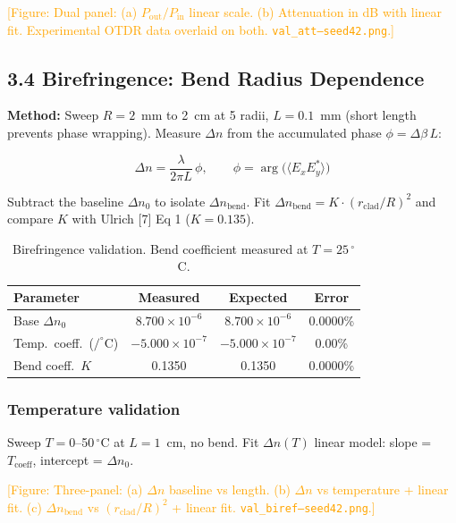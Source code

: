 \documentclass[11pt,a4paper]{article}
\newcommand{\figref}[1]{\textcolor{orange}{[Figure: #1]}}
\begin{document}
\figref{Dual panel: (a) $P_{\text{out}}/P_{\text{in}}$ linear scale.
  (b) Attenuation in dB with linear fit.  Experimental OTDR data
  overlaid on both.  {\tt val\_att--seed42.png}.}

\subsection{3.4 Birefringence: Bend Radius Dependence}
\label{sec:val-biref}

\textbf{Method:} Sweep $R = 2$~mm to 2~cm at 5 radii, $L = 0.1$~mm
(short length prevents phase wrapping).  Measure $\Delta n$ from the
accumulated phase $\phi = \Delta\beta\,L$:

\begin{equation}
  \Delta n = \frac{\lambda}{2\pi L}\,\phi,
  \qquad
  \phi = \arg\!\bigl(\langle E_x E_y^*\rangle\bigr)
\end{equation}

Subtract the baseline $\Delta n_0$ to isolate $\Delta n_{\text{bend}}$.
Fit $\Delta n_{\text{bend}} = K \cdot (r_{\text{clad}}/R)^2$ and compare
$K$ with Ulrich [7] Eq 1 ($K = 0.135$).

\begin{table}[!ht]
  \caption{Birefringence validation.  Bend coefficient measured at
    $T = 25\,^\circ$C.}
  \label{tab:biref-results}
  \begin{tabular}{l c c c}
    \toprule
    \textbf{Parameter} & \textbf{Measured} & \textbf{Expected} & \textbf{Error} \\
    \midrule
    Base $\Delta n_0$     & $8.700\times10^{-6}$ & $8.700\times10^{-6}$ & 0.0000\% \\
    Temp.\ coeff.\ ($/^\circ$C) & $-5.000\times10^{-7}$ & $-5.000\times10^{-7}$ & 0.00\% \\
    Bend coeff.\ $K$      & 0.1350 & 0.1350 & 0.0000\% \\
    \bottomrule
  \end{tabular}
\end{table}

\subsubsection*{Temperature validation}
Sweep $T = 0$--50$\,^\circ$C at $L = 1$~cm, no bend.
Fit $\Delta n(T)$ linear model: slope = $T_{\text{coeff}}$,
intercept = $\Delta n_0$.

\figref{Three-panel: (a) $\Delta n$ baseline vs length.  (b) $\Delta n$
  vs temperature + linear fit.  (c) $\Delta n_{\text{bend}}$ vs
  $(r_{\text{clad}}/R)^2$ + linear fit.  {\tt val\_biref--seed42.png}.}
\end{document}
